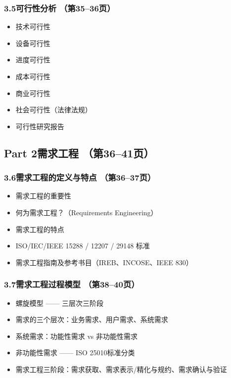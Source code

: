 \documentclass[12pt,a4paper]{ctexart}
\begin{document}
\subsubsection{3.5\quad 可行性分析 \hfill（第35--36页）}
\begin{itemize}
    \item 技术可行性
    \item 设备可行性
    \item 进度可行性
    \item 成本可行性
    \item 商业可行性
    \item 社会可行性（法律法规）
    \item 可行性研究报告
\end{itemize}

\subsection{Part 2\quad 需求工程 \hfill（第36--41页）}

\subsubsection{3.6\quad 需求工程的定义与特点 \hfill（第36--37页）}
\begin{itemize}
    \item 需求工程的重要性
    \item 何为需求工程？（Requirements Engineering）
    \item 需求工程的特点
    \item ISO/IEC/IEEE 15288 / 12207 / 29148 标准
    \item 需求工程指南及参考书目（IREB、INCOSE、IEEE 830）
\end{itemize}

\subsubsection{3.7\quad 需求工程过程模型 \hfill（第38--40页）}
\begin{itemize}
    \item 螺旋模型 —— 三层次三阶段
    \item 需求的三个层次：业务需求、用户需求、系统需求
    \item 系统需求：功能性需求 vs 非功能性需求
    \item 非功能性需求 —— ISO 25010标准分类
    \item 需求工程三阶段：需求获取、需求表示/精化与规约、需求确认与验证
\end{itemize}
\end{document}
